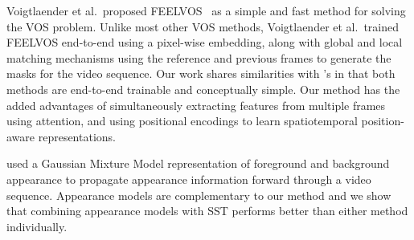 Voigtlaender et al.\ proposed FEELVOS~\citep{feelvos2019} as a simple and fast
method for solving the VOS problem.
Unlike most other VOS methods, Voigtlaender et al.\ trained FEELVOS end-to-end
using a pixel-wise embedding, along with global and local matching mechanisms
using the reference and previous frames to generate the masks for the video
sequence.
Our work shares similarities with \citet{feelvos2019}'s in
that both methods are end-to-end trainable and conceptually simple.
Our method has the added advantages of simultaneously extracting features from
multiple frames using attention, and using positional encodings to learn
spatiotemporal position-aware representations.

\citet{johnander2019agenerative} used a Gaussian Mixture Model
representation of foreground and background appearance to propagate appearance
information forward through a video sequence.
Appearance models are complementary to our method and we show that combining
appearance models with SST performs better than either method individually.







